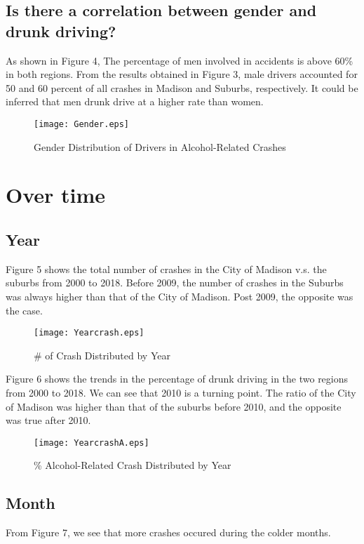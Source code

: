 \documentclass[10pt]{article}
\begin{document}
\newpage
\subsection{Is there a correlation between gender and drunk driving?}

As shown in Figure 4, The percentage of men involved in accidents is above 60\% in both regions. From the results obtained in Figure 3, male drivers accounted for 50 and 60 percent of all crashes in Madison and Suburbs, respectively. It could be inferred that men drunk drive at a higher rate than women.

\begin{figure}[H]
\flushleft
\texttt{[image: Gender.eps]}
\caption{Gender Distribution of Drivers in Alcohol-Related Crashes}
\label{4}
\end{figure}

\newpage
\section{Over time}
\subsection{Year}
Figure 5 shows the total number of crashes in the City of Madison v.s. the suburbs from 2000 to 2018. Before 2009, the number of crashes in the Suburbs was always higher than that of the City of Madison. Post 2009, the opposite was the case.

\begin{figure}[H]
\flushleft
\texttt{[image: Yearcrash.eps]}
\caption{\# of Crash Distributed by Year}
\label{5}
\end{figure}

\newpage
Figure 6 shows the trends in the percentage of drunk driving in the two regions from 2000 to 2018. We can see that 2010 is a turning point. The ratio of the City of Madison was higher than that of the suburbs before 2010, and the opposite was true after 2010.

\begin{figure}[H]
\flushleft
\texttt{[image: YearcrashA.eps]}
\caption{\% Alcohol-Related Crash Distributed by Year}
\label{6}
\end{figure}

\newpage
\subsection{Month}
From Figure 7, we see that more crashes occured during the colder months.
\end{document}
